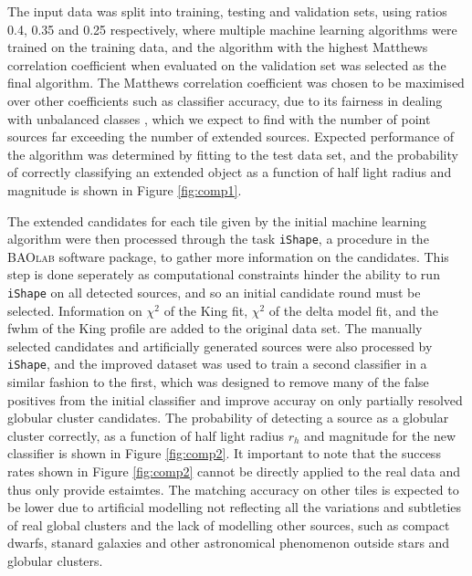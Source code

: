 \documentclass[useAMS,usenatbib]{mn2e}
\begin{document}
The input data was split into training, testing and validation sets, using ratios 0.4, 0.35 and 0.25 respectively, where multiple machine learning algorithms were trained on the training data, and the algorithm with the highest Matthews correlation coefficient\citep{matthews1975comparison} when evaluated on the validation set was selected as the final algorithm. The Matthews correlation coefficient was chosen to be maximised over other coefficients such as classifier accuracy, due to its fairness in dealing with unbalanced classes \citep{Baldi2000, Jurman2012}, which we expect to find with the number of point sources far exceeding the number of extended sources. Expected performance of the algorithm was determined by fitting to the test data set, and the probability of correctly classifying an extended object as a function of half light radius and magnitude is shown in Figure \ref{fig:comp1}.

The extended candidates for each tile given by the initial machine learning algorithm were then processed through the task \verb|iShape|, a procedure in the \textsc{BAOlab} software package, to gather more information on the candidates. This step is done seperately as computational constraints hinder the ability to run \verb|iShape| on all detected sources, and so an initial candidate round must be selected. Information on $\chi^2$ of the King fit, $\chi^2$ of the delta model fit, and the fwhm of the King profile are added to the original data set. The manually selected candidates and artificially generated sources were also processed by \verb|iShape|, and the improved dataset was used to train a second classifier in a similar fashion to the first, which was designed to remove many of the false positives from the initial classifier and improve accuray on only partially resolved globular cluster candidates. The probability of detecting a source as a globular cluster correctly, as a function of half light radius $r_h$ and magnitude for the new classifier is shown in Figure \ref{fig:comp2}. It important to note that the success rates shown in Figure \ref{fig:comp2} cannot be directly applied to the real data and thus only provide estaimtes. The matching accuracy on other tiles is expected to be lower due to artificial modelling not reflecting all the variations and subtleties of real global clusters and the lack of modelling other sources, such as compact dwarfs, stanard galaxies and other astronomical phenomenon outside stars and globular clusters. 
\end{document}
